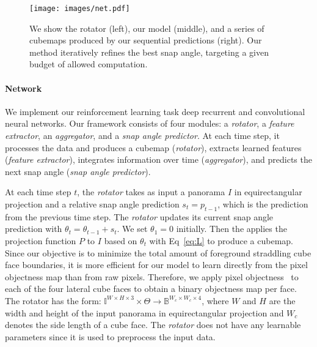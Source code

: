 \begin{figure*}[t]
\centering
\renewcommand{\tabcolsep}{0pt}
\texttt{[image: images/net.pdf]}%
\caption{We show the rotator (left), our model (middle), and a series of cubemaps produced by our sequential predictions (right). Our method iteratively refines the best snap angle, targeting a given budget of allowed computation.
}%
\label{fig:net}
\vspace{-0.15in}
\end{figure*}



\vspace*{-0.1in}
\paragraph{Network}  We implement our reinforcement learning task  deep recurrent and convolutional neural networks.    
Our framework consists of four modules: a \textit{rotator}, a \textit{feature extractor}, an \textit{aggregator}, and a \textit{snap angle predictor}. At each time step, it processes the data and produces a cubemap (\textit{rotator}), extracts learned features (\textit{feature extractor}), integrates information over time (\textit{aggregator}), and predicts the next snap angle (\textit{snap angle predictor}).

At each time step $t$, the \textit{rotator} takes as input a panorama $I$ in equirectangular projection and a relative snap angle prediction $s_{t}=p_{t-1}$, which is the prediction from the previous time step. The \textit{rotator} updates its current snap angle prediction with $\theta_t=\theta_{t-1}+s_{t}$. We set $\theta_1=0$ initially.
Then the  applies the projection function $P$ to $I$ based on $\theta_t$ with Eq~\ref{eq:L} to produce a cubemap. 
Since our objective is to minimize the total amount of foreground straddling cube face boundaries, it is more efficient for our model to learn directly from the pixel objectness map than from raw pixels. 
Therefore, we apply pixel objectness~\cite{jain2017pixel} to each of the four lateral cube faces to obtain a binary objectness map per face. %
The rotator has the form:
$\mathbb{I} ^{W \times H \times 3}\times \Theta \rightarrow \mathbb{B}^{W_c \times W_c \times 4}$,
%
where $W$ and $H$ are the width and height of the input panorama in equirectangular projection and $W_c$ denotes the side length of a cube face. The \textit{rotator} does not have any learnable parameters since it is used to preprocess the input data.

